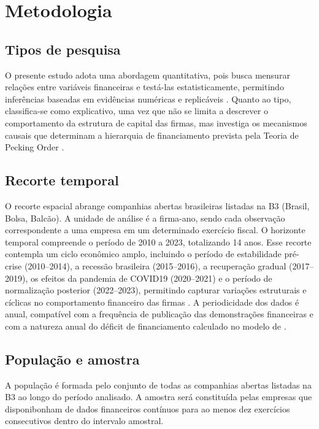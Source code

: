 \documentclass[a4paper,12pt]{article}
\begin{document}
\newpage

\section{Metodologia}
 
\subsection{Tipos de pesquisa}
 
O presente estudo adota uma abordagem quantitativa, pois busca mensurar relações entre variáveis financeiras e testá-las estatisticamente, permitindo inferências baseadas em evidências numéricas e replicáveis \cite{richardson2017pesquisa}. Quanto ao tipo, classifica-se como explicativo, uma vez que não se limita a descrever o comportamento da estrutura de capital das firmas, mas investiga os mecanismos causais que determinam a hierarquia de financiamento prevista pela Teoria de Pecking Order \cite{gil2008metodos}.
 
\subsection{Recorte temporal}

O recorte espacial abrange companhias abertas brasileiras listadas na B3 (Brasil, Bolsa, Balcão). A unidade de análise é a firma-ano, sendo cada observação correspondente a uma empresa em um determinado exercício fiscal. O horizonte temporal compreende o período de 2010 a 2023, totalizando 14 anos. Esse recorte contempla um ciclo econômico amplo, incluindo o período de estabilidade pré-crise (2010–2014), a recessão brasileira (2015–2016), a recuperação gradual (2017–2019), os efeitos da pandemia de COVID19 (2020–2021) e o período de normalização posterior (2022–2023), permitindo capturar variações estruturais e cíclicas no comportamento financeiro das firmas \cite{Souza2024}. A periodicidade dos dados é anual, compatível com a frequência de publicação das demonstrações financeiras e com a natureza anual do déficit de financiamento calculado no modelo de \cite{shyam1999}.
 
\subsection{População e amostra}
A população é formada pelo conjunto de todas as companhias abertas listadas na B3 ao longo do período analisado. A amostra será constituída pelas empresas que disponibonham de dados financeiros contínuos para ao menos dez exercícios consecutivos dentro do intervalo amostral. 
\end{document}
